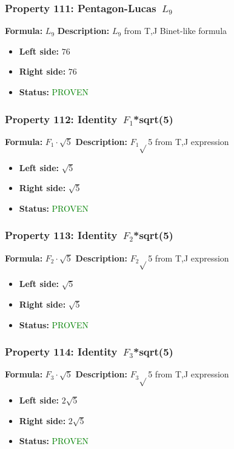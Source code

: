 \subsubsection*{Property 111: Pentagon-Lucas~$L_{9}$}
\textbf{Formula:} $L_9$
\textbf{Description:} $L_{9}$ from T,J Binet-like formula

\begin{itemize}
\item \textbf{Left side:} $76$
\item \textbf{Right side:} $76$
\item \textbf{Status:} \textcolor{green}{PROVEN}
\end{itemize}

\subsubsection*{Property 112: Identity~$F_{1}$*sqrt(5)}
\textbf{Formula:} $F_1 \cdot \sqrt{5}$
\textbf{Description:} $F_{1}$$\sqrt{}$5 from T,J expression

\begin{itemize}
\item \textbf{Left side:} $\sqrt{5}$
\item \textbf{Right side:} $\sqrt{5}$
\item \textbf{Status:} \textcolor{green}{PROVEN}
\end{itemize}

\subsubsection*{Property 113: Identity~$F_{2}$*sqrt(5)}
\textbf{Formula:} $F_2 \cdot \sqrt{5}$
\textbf{Description:} $F_{2}$$\sqrt{}$5 from T,J expression

\begin{itemize}
\item \textbf{Left side:} $\sqrt{5}$
\item \textbf{Right side:} $\sqrt{5}$
\item \textbf{Status:} \textcolor{green}{PROVEN}
\end{itemize}

\subsubsection*{Property 114: Identity~$F_{3}$*sqrt(5)}
\textbf{Formula:} $F_3 \cdot \sqrt{5}$
\textbf{Description:} $F_{3}$$\sqrt{}$5 from T,J expression

\begin{itemize}
\item \textbf{Left side:} $2 \sqrt{5}$
\item \textbf{Right side:} $2 \sqrt{5}$
\item \textbf{Status:} \textcolor{green}{PROVEN}
\end{itemize}

